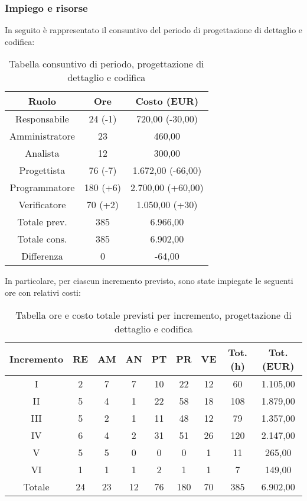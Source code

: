 \subsubsection{Impiego e risorse}
In seguito è rappresentato il consuntivo del periodo di progettazione di dettaglio e codifica:
\begin{table}[h]
	\caption{Tabella consuntivo di periodo, progettazione di dettaglio e codifica}  
	\begin{center}
		\begin{tabular}{ |c|c|c|  }
			\hline
			Ruolo 		& Ore & Costo (EUR)\\
			\hline\hline
			Responsabile	& 24 (-1) & 720,00 (-30,00)\\
			Amministratore	& 23 & 460,00\\
			Analista		& 12 & 300,00\\
			Progettista		& 76 (-7) & 1.672,00 (-66,00)\\
			Programmatore	& 180 (+6) & 2.700,00 (+60,00)\\
			Verificatore	& 70 (+2) & 1.050,00 (+30)\\
			\hline\hline
			Totale prev.	& 385 & 6.966,00 \\
			Totale cons.	& 385 & 6.902,00 \\
			Differenza		& 0 & -64,00 \\
			\hline
		\end{tabular}
	\end{center}
\end{table}

\newpage
\noindent In particolare, per ciascun incremento previsto, sono state impiegate le seguenti ore con relativi costi:

\begin{table}[h]
	\caption{Tabella ore e costo totale previsti per incremento, progettazione di dettaglio e codifica}
	\begin{center}
		\begin{tabular}{ |c|c|c|c|c|c|c|c|c|  }
			\hline
			Incremento 		& RE 	& AM 	& AN 	& PT 	& PR 	& VE 	& Tot. (h) & Tot. (EUR) \\
			\hline\hline
			I		& 2 		& 7			& 7 	& 10 	& 22 		& 12 		& 60	 & 1.105,00\\
			II		& 5 		& 4 		& 1 	& 22	& 58 		& 18 		&108	&1.879,00\\
			III		& 5 		& 2 		& 1 	& 11	& 48 		& 12 		& 79	&1.357,00\\
			IV		& 6 		& 4 		& 2 	& 31 	& 51 		& 26 		& 120 	&2.147,00\\
			V		& 5 		& 5 		& 0 	& 0		& 0 		& 1	 		& 11			&265,00\\
			VI		& 1 		& 1 		& 1 	& 2 	& 1 		& 1 		& 7			&149,00\\
			\hline\hline
			Totale		& 24		& 23		& 12 	& 76	 	& 180 	& 70 	& 385 	&6.902,00\\
			\hline
		\end{tabular}
	\end{center}
\end{table}

